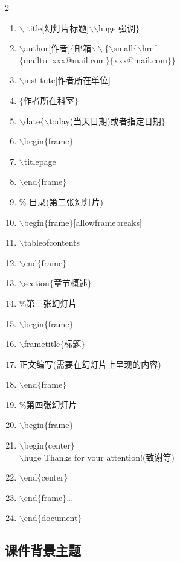 \begin{multicols}{2}
\begin{enumerate}
\item$\backslash${} title[幻灯片标题]$\backslash$$\backslash$huge{} 强调$\}$
\item$\backslash$author[作者]$\{$邮箱$\backslash\backslash\{ \backslash$small$\{$$\backslash$href\\ \hspace*{-20pt}$\{$mailto: xxx@mail.com$\}\{$xxx@mail.com$\}\}$
\item$\backslash$institute[作者所在单位]
\item$\{$作者所在科室$\}$
\item$\backslash$date$\{$$\backslash$today(当天日期)或者指定日期$\}$
\item$\backslash$begin$\{$frame$\}$
\item$\backslash$titlepage
\item$\backslash$end$\{$frame$\}$
\item \% 目录(第二张幻灯片)
\item$\backslash$begin$\{$frame$\}$[allowframebreaks]
\item$\backslash$tableofcontents
\item$\backslash$end$\{$frame$\}$
\item$\backslash$section$\{$章节概述$\}$
\item$\%$第三张幻灯片
\item$\backslash$begin$\{$frame$\}$
\item$\backslash$frametitle$\{$标题$\}$
\item 正文编写(需要在幻灯片上呈现的内容)
\item$\backslash$end$\{$frame$\}$
\item$\%$第四张幻灯片
\item$\backslash$begin$\{$frame$\}$
\item$\backslash$begin$\{$center$\}$\\$\backslash$huge Thanks for your attention!(致谢等)
\item$\backslash$end$\{$center$\}$
\item$\backslash$end$\{$frame$\}$\ldots
\item$\backslash$end$\{$document$\}$
\end{enumerate}
\end{multicols}

\subsection{课件背景主题}

